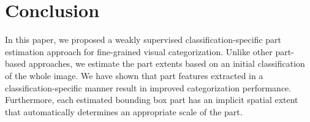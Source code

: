 \documentclass[runningheads]{llncs}
\begin{document}
  	\section{Conclusion}
\label{sec:conclusion}

In this paper, we proposed a weakly supervised classification-specific part estimation approach for fine-grained visual categorization.
Unlike other part-based approaches, we estimate the part extents based on an initial classification of the whole image.
We have shown that part features extracted in a classification-specific manner result in improved categorization performance.
Furthermore, each estimated bounding box part has an implicit spatial extent that automatically determines an appropriate scale of the part.

 
	\newpage
	
	
\end{document}
